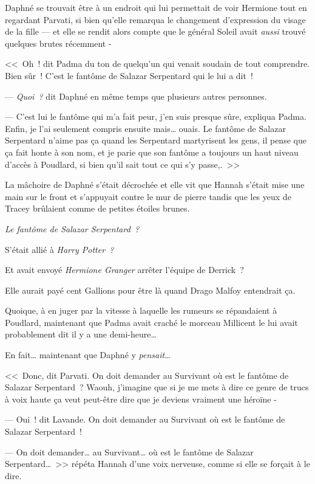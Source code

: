 Daphné se trouvait être à un endroit qui lui permettait de voir Hermione tout en regardant Parvati, si bien qu'elle remarqua le changement d'expression du visage de la fille — et elle se rendit alors compte que le général Soleil avait \emph{aussi} trouvé quelques brutes récemment -

<<~Oh~! dit Padma du ton de quelqu'un qui venait soudain de tout comprendre. Bien sûr~! C'est le fantôme de Salazar Serpentard qui le lui a dit~!

--- \emph{Quoi~?} dit Daphné en même temps que plusieurs autres personnes.

--- C'est lui le fantôme qui m'a fait peur, j'en suis presque sûre, expliqua Padma. Enfin, je l'ai seulement compris ensuite mais… ouais. Le fantôme de Salazar Serpentard n'aime pas ça quand les Serpentard martyrisent les gens, il pense que ça fait honte à son nom, et je parie que son fantôme a toujours un haut niveau d'accès à Poudlard, si bien qu'il sait tout ce qui s'y passe,.~>>

La mâchoire de Daphné s'était décrochée et elle vit que Hannah s'était mise une main sur le front et s'appuyait contre le mur de pierre tandis que les yeux de Tracey brûlaient comme de petites étoiles brunes.

\emph{Le fantôme de Salazar Serpentard~?}

S'était allié à \emph{Harry Potter~?}

Et avait envoyé \emph{Hermione Granger} arrêter l'équipe de Derrick~?

Elle aurait payé cent Gallions pour être là quand Drago Malfoy entendrait ça.

Quoique, à en juger par la vitesse à laquelle les rumeurs se répandaient à Poudlard, maintenant que Padma avait craché le morceau Millicent le lui avait probablement dit il y a une demi-heure…

En fait… maintenant que Daphné y \emph{pensait}…

<<~Donc, dit Parvati. On doit demander au Survivant où est le fantôme de Salazar Serpentard~? Waouh, j'imagine que si je me mets à dire ce genre de trucs à voix haute ça veut peut-être dire que je deviens vraiment une héroïne -

--- Oui~! dit Lavande. On doit demander au Survivant où est le fantôme de Salazar Serpentard~!

--- On doit demander… au Survivant… où est le fantôme de Salazar Serpentard…~>> répéta Hannah d'une voix nerveuse, comme si elle se forçait à le dire.

